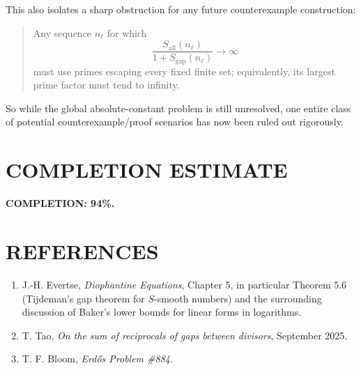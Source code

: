 This also isolates a sharp obstruction for any future counterexample construction:

\begin{quote}
Any sequence \(n_\ell\) for which
\[
\frac{S_{\mathrm{all}}(n_\ell)}{1+S_{\mathrm{gap}}(n_\ell)}\to\infty
\]
must use primes escaping every fixed finite set; equivalently, its largest prime factor must tend to infinity.
\end{quote}

So while the global absolute-constant problem is still unresolved, one entire class of potential counterexample/proof scenarios has now been ruled out rigorously.

\section{COMPLETION ESTIMATE}

\noindent \textbf{COMPLETION: 94\%.}

\section{REFERENCES}

\begin{enumerate}
\item J.-H. Evertse, \emph{Diophantine Equations}, Chapter 5, in particular Theorem 5.6 (Tijdeman's gap theorem for \(S\)-smooth numbers) and the surrounding discussion of Baker's lower bounds for linear forms in logarithms.
\item T. Tao, \emph{On the sum of reciprocals of gaps between divisors}, September 2025.
\item T. F. Bloom, \emph{Erd\H{o}s Problem \#884}.
\end{enumerate}
